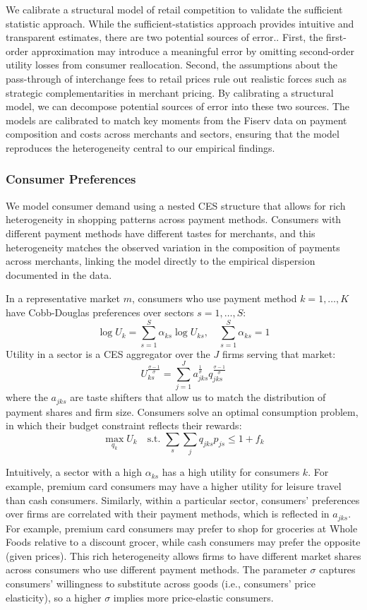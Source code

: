 \documentclass[main.tex]{subfiles}
\begin{document}
We calibrate a structural model of retail competition to validate the sufficient statistic approach.
While the sufficient-statistics approach provides intuitive and transparent estimates, there are two potential sources of error..
First, the first-order approximation may introduce a meaningful error by omitting second-order utility losses from consumer reallocation.
Second, the assumptions about the pass-through of interchange fees to retail prices rule out realistic forces such as strategic complementarities in merchant pricing.
By calibrating a structural model, we can decompose potential sources of error into these two sources.
The models are calibrated to match key moments from the Fiserv data on payment composition and costs across merchants and sectors, ensuring that the model reproduces the heterogeneity central to our empirical findings.

\subsubsection{Consumer Preferences}

We model consumer demand using a nested CES structure that allows for rich heterogeneity in shopping patterns across payment methods.
Consumers with different payment methods have different tastes for merchants, and this heterogeneity matches the observed variation in the composition of payments across merchants, linking the model directly to the empirical dispersion documented in the data.

In a representative market $m$, consumers who use payment method $k=1,\dots,K$ have Cobb-Douglas preferences over sectors $s=1,\dots,S$:
\[
\log U_{k}=\sum_{s=1}^{S}\alpha_{ks}\log U_{ks},\quad\sum_{s=1}^{S}\alpha_{ks}=1
\]
Utility in a sector is a CES aggregator over the $J$ firms serving that market:
\[
U_{ks}^{\frac{\sigma-1}{\sigma}}=\sum_{j=1}^{J}a_{jks}^{\frac{1}{\sigma}}q_{jks}^{\frac{\sigma-1}{\sigma}}
\]
where the $a_{jks}$ are taste shifters that allow us to match the distribution of payment shares and firm size. Consumers solve an optimal consumption problem, in which their budget constraint reflects their rewards:
\begin{equation}
\max_{q_{k}}U_{k}\quad\text{s.t. }\sum_{s}\sum_{j}q_{jks}p_{js}\leq1+f_{k} \label{eq:consumption-problem}
\end{equation}

Intuitively, a sector with a high $\alpha_{ks}$ has a high utility for consumers $k$.
For example, premium card consumers may have a higher utility for leisure travel than cash consumers.
Similarly, within a particular sector, consumers' preferences over firms are correlated with their payment methods, which is reflected in $a_{jks}$.
For example, premium card consumers may prefer to shop for groceries at Whole Foods relative to a discount grocer, while cash consumers may prefer the opposite (given prices).
This rich heterogeneity allows firms to have different market shares across consumers who use different payment methods.
The parameter $\sigma$ captures consumers' willingness to substitute across goods (i.e., consumers' price elasticity), so a higher $\sigma$ implies more price-elastic consumers. 
\end{document}
